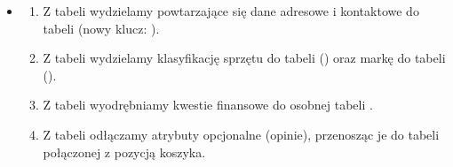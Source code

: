 \documentclass[letterpaper,10pt,polish]{sphinxmanual}
\begin{document}
\sphinxAtStartPar
{}
\begin{itemize}
\item {} \begin{description}
\begin{enumerate}
%
\item {} 
\sphinxAtStartPar
Z tabeli  wydzielamy powtarzające się dane adresowe i kontaktowe do tabeli  (nowy klucz: ).

\item {} 
\sphinxAtStartPar
Z tabeli  wydzielamy klasyfikację sprzętu do tabeli  () oraz markę do tabeli  ().

\item {} 
\sphinxAtStartPar
Z tabeli  wyodrębniamy kwestie finansowe do osobnej tabeli .

\item {} 
\sphinxAtStartPar
Z tabeli  odłączamy atrybuty opcjonalne (opinie), przenosząc je do tabeli  połączonej z pozycją koszyka.

\end{enumerate}

\end{description}

\end{itemize}
\end{document}
